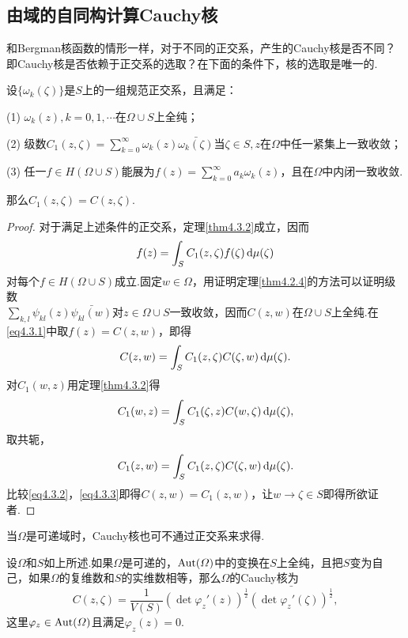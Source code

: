 \subsection{由域的自同构计算Cauchy核}
和Bergman核函数的情形一样，对于不同的正交系，产生的Cauchy核是否不同？即Cauchy核是否依赖于正交系的选取？在下面的条件下，核的选取是唯一的.
\begin{theorem}\label{thm4.3.3}
	设$\{\omega_k(\zeta)\}$是$S$上的一组规范正交系，且满足：
	
	(1)\hypertarget{4.3.3}{}
	$\omega_k(z),k=0,1,\cdots$在$\Omega\cup S$上全纯；
	
	(2)\hypertarget{4.3.3}{}
	级数$C_1(z,\zeta)=\sum\limits_{k=0}^\infty \omega_k(z)\bar{\omega_k(\zeta)}$当$\zeta\in S,z$在$\Omega$中任一紧集上一致收敛；
	
	(3)\hypertarget{4.3.3}{}
	任一$f\in H(\Omega\cup S)$能展为$f(z)=\sum\limits_{k=0}^\infty a_k\omega_k(z)$，且在$\Omega$中内闭一致收敛.
	
	那么$C_1(z,\zeta)=C(z,\zeta)$.
\end{theorem}
\begin{proof}
	对于满足上述条件的正交系，定理\ref{thm4.3.2}成立，因而
	\begin{equation}\label{eq4.3.1}
		f(z)=\int_S C_1(z,\zeta)f(\zeta)\mathop{}\!\mathrm{d}\mu(\zeta)
	\end{equation}
对每个$f\in H(\Omega\cup S)$成立.固定$w\in\Omega$，用证明定理\ref{thm4.2.4}的方法可以证明级数\\
$\sum\limits_{k,l}\psi_{kl}(z)\bar{\psi_{kl}(w)}$对$z\in\Omega\cup S$一致收敛，因而$C(z,w)$在$\Omega\cup S$上全纯.在\eqref{eq4.3.1}中取$f(z)=C(z,w)$，即得
\begin{equation}\label{eq4.3.2}
	C(z,w)=\int_S C_1(z,\zeta)C(\zeta,w)\mathop{}\!\mathrm{d}\mu(\zeta).
\end{equation}
对$C_1(w,z)$用定理\ref{thm4.3.2}得
\[C_1(w,z)=\int_S C_1(\zeta,z)C(w,\zeta)\mathop{}\!\mathrm{d}\mu(\zeta),\]
取共轭，
\begin{equation}\label{eq4.3.3}
	C_1(z,w)=\int_S C_1(z,\zeta)C(\zeta,w)\mathop{}\!\mathrm{d}\mu(\zeta).
\end{equation}
比较\eqref{eq4.3.2}，\eqref{eq4.3.3}即得$C(z,w)=C_1(z,w)$，让$w\to\zeta\in S$即得所欲证者.
\end{proof}
当$\Omega$是可递域时，Cauchy核也可不通过正交系来求得.
\begin{theorem}\label{thm4.3.4}
	设$\Omega$和$S$如上所述.如果$\Omega$是可递的，$\operatorname{Aut}(\varOmega)$中的变换在$S$上全纯，且把$S$变为自己，如果$\Omega$的复维数和$S$的实维数相等，那么$\Omega$的Cauchy核为
	\[C(z,\zeta)=\frac1{V(S)}\left(\det\varphi_z'(z)\right)^{\frac12}\bar{\left(\det\varphi_z'(\zeta)\right)^{\frac12}},\]
	这里$\varphi_z\in\operatorname{Aut}(\varOmega)$且满足$\varphi_z(z)=0$.
\end{theorem}
